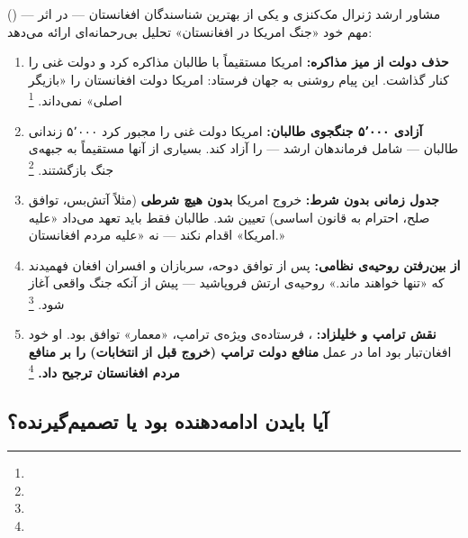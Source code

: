 \begin{tcolorbox}[casebox, title={چرا توافق دوحه «خیانت» به دولت افغانستان بود؟}]

 () — مشاور ارشد ژنرال مک‌کنزی و یکی از بهترین شناسندگان افغانستان — در اثر مهم خود «جنگ امریکا در افغانستان» تحلیل بی‌رحمانه‌ای ارائه می‌دهد:

\begin{enumerate}[nosep, label=\textbf{\arabic*.}]
  \item \textbf{حذف دولت از میز مذاکره:} امریکا مستقیماً با طالبان مذاکره کرد و دولت غنی را کنار گذاشت. این پیام روشنی به جهان فرستاد: امریکا دولت افغانستان را «بازیگر اصلی» نمی‌داند.%
  \footnote{}

  \item \textbf{آزادی ۵٬۰۰۰ جنگجوی طالبان:} امریکا دولت غنی را مجبور کرد ۵٬۰۰۰ زندانی طالبان — شامل فرماندهان ارشد — را آزاد کند. بسیاری از آنها مستقیماً به جبهه‌ی جنگ بازگشتند.%
  \footnote{}

  \item \textbf{جدول زمانی بدون شرط:} خروج امریکا \textbf{بدون هیچ شرطی} (مثلاً آتش‌بس، توافق صلح، احترام به قانون اساسی) تعیین شد. طالبان فقط باید تعهد می‌داد «علیه امریکا» اقدام نکند — نه «علیه مردم افغانستان.»

  \item \textbf{از بین‌رفتن روحیه‌ی نظامی:} پس از توافق دوحه، سربازان و افسران افغان فهمیدند که «تنها خواهند ماند.» روحیه‌ی ارتش فروپاشید — پیش از آنکه جنگ واقعی آغاز شود.%
  \footnote{}

  \item \textbf{نقش ترامپ و خلیلزاد:} ، فرستاده‌ی ویژه‌ی ترامپ، «معمار» توافق بود. او خود افغان‌تبار بود اما در عمل \textbf{منافع دولت ترامپ (خروج قبل از انتخابات) را بر منافع مردم افغانستان ترجیح داد.}%
  \footnote{}
\end{enumerate}
\end{tcolorbox}

\subsection{آیا بایدن ادامه‌دهنده بود یا تصمیم‌گیرنده؟}


